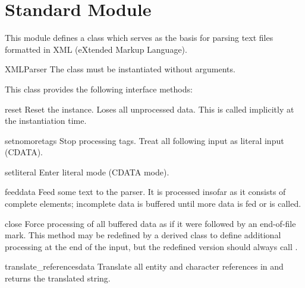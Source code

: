 \section{Standard Module }
\label{module-xmllib}

This module defines a class  which serves as the basis 
for parsing text files formatted in XML (eXtended Markup Language).

\begin{classdesc}{XMLParser}{}
The  class must be instantiated without arguments.
\end{classdesc}

This class provides the following interface methods:


\begin{funcdesc}{reset}{}
Reset the instance.  Loses all unprocessed data.  This is called
implicitly at the instantiation time.
\end{funcdesc}

\begin{funcdesc}{setnomoretags}{}
Stop processing tags.  Treat all following input as literal input
(CDATA).
\end{funcdesc}

\begin{funcdesc}{setliteral}{}
Enter literal mode (CDATA mode).
\end{funcdesc}

\begin{funcdesc}{feed}{data}
Feed some text to the parser.  It is processed insofar as it consists
of complete elements; incomplete data is buffered until more data is
fed or  is called.
\end{funcdesc}

\begin{funcdesc}{close}{}
Force processing of all buffered data as if it were followed by an
end-of-file mark.  This method may be redefined by a derived class to
define additional processing at the end of the input, but the
redefined version should always call .
\end{funcdesc}

\begin{funcdesc}{translate_references}{data}
Translate all entity and character references in  and
returns the translated string.
\end{funcdesc}

